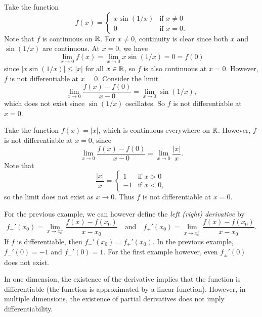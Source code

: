 \begin{example}
  Take the function
  \[
    f(x) = \begin{cases}
      x \sin(1/x) & \text{if } x \ne 0 \\
      0 & \text{if } x = 0.
    \end{cases}
  \]
  Note that $f$ is continuous on $\mathbb{R}$. For $x \ne 0$,
  continuity is clear since both $x$ and $\sin(1/x)$
  are continuous. At $x = 0$, we have
  \[
    \lim_{x \to 0} f(x) = \lim_{x \to 0} x \sin(1/x) = 0 = f(0)
  \]
  since $|x \sin(1/x)| \le |x|$ for all $x \in \mathbb{R}$,
  so $f$ is also continuous at $x = 0$. However,
  $f$ is not differentiable at $x = 0$. Consider the
  limit
  \[
    \lim_{x \to 0} \frac{f(x) - f(0)}{x - 0} = \lim_{x \to 0} \sin(1/x),
  \]
  which does not exist since $\sin(1/x)$ oscillates. So
  $f$ is not differentiable at $x = 0$.
\end{example}

\begin{example}
  Take the function $f(x) = |x|$, which is continuous
  everywhere on $\mathbb{R}$. However, $f$ is not differentiable at
  $x = 0$, since
  \[
    \lim_{x \to 0} \frac{f(x) - f(0)}{x - 0} = \lim_{x \to 0} \frac{|x|}{x}.
  \]
  Note that
  \[
    \frac{|x|}{x} = \begin{cases}
      1 & \text{if } x > 0 \\
      -1 & \text{if } x < 0,
    \end{cases}
  \]
  so the limit does not exist as $x \to 0$. Thus
  $f$ is not differentiable at $x = 0$.
\end{example}

\begin{remark}
  For the previous example, we can however define
  the \emph{left (right) derivative} by
  \[
    f_-'(x_0) = \lim_{x \to x_0^-} \frac{f(x) - f(x_0)}{x - x_0}
  \quad \text{and} \quad f_+'(x_0) = \lim_{x \to x_0^+} \frac{f(x) - f(x_0)}{x - x_0}.
  \]
  If $f$ is differentiable, then
  $f_-'(x_0) = f_+'(x_0)$. In the previous example,
  $f_-'(0) = -1$ and $f_+'(0) = 1$. For the first
  example however, even $f_{\pm}'(0)$ does not exist.
\end{remark}

\begin{remark}
  In one dimension, the existence of the derivative
  implies that the function is differentiable (the
  function is approximated by a linear function). However,
  in multiple dimensions, the existence of partial
  derivatives does not imply differentiability.
\end{remark}

